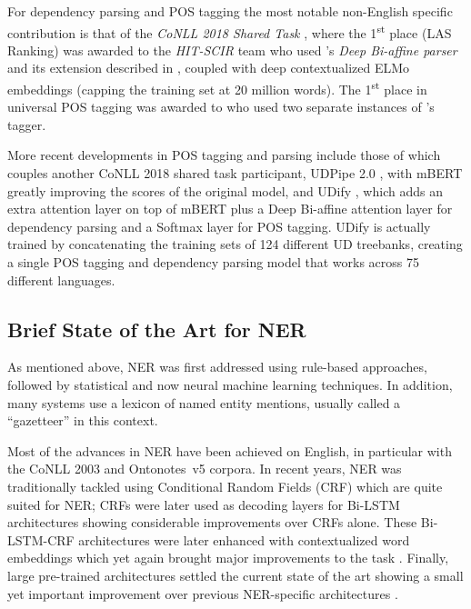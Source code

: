 For dependency parsing and POS tagging the most notable non-English specific contribution is that of the \emph{CoNLL 2018 Shared Task} \citep{zeman-etal-2018-conll}, where the 1\textsuperscript{st} place (LAS Ranking) was awarded to the \emph{HIT-SCIR} team \citep{che-etal-2018-towards} who used \citet{dozat-manning-2017-deep}'s \emph{Deep Bi-affine parser} and its extension described in \citep{dozat-etal-2017-stanfords}, coupled with deep contextualized ELMo embeddings \citep{peters-etal-2018-deep} (capping the training set at 20 million words). The 1\textsuperscript{st} place in universal POS tagging was awarded to \citet{smith-etal-2018-82} who used two separate instances of \citet{bohnet-etal-2018-morphosyntactic}'s tagger.

More recent developments in POS tagging and parsing include those of \citet{straka-strakova-2019-evaluating} which couples another CoNLL 2018 shared task participant, UDPipe 2.0 \citep{straka-2018-udpipe}, with mBERT greatly improving the scores of the original model, and UDify \citep{kondratyuk-straka-2019-75}, which adds an extra attention layer on top of mBERT plus a Deep Bi-affine attention layer for dependency parsing and a Softmax layer for POS tagging. UDify is actually trained by concatenating the training sets of 124 different UD treebanks, creating a single POS tagging and dependency parsing model that works across 75 different languages.

\subsection{Brief State of the Art for NER}
\label{subsec:sota}

As mentioned above, NER was first addressed using rule-based approaches, followed by statistical and now neural machine learning techniques. In addition, many systems use a lexicon of named entity mentions, usually called a ``gazetteer'' in this context.

Most of the advances in NER  have been achieved on English, in particular with the CoNLL 2003 \citep{tjong-kim-sang-de-meulder-2003-introduction} and  Ontonotes~v5 \citep{pradhan-etal-2012-conll,pradhan-etal-2013-towards} corpora. In recent years, NER was traditionally tackled using Conditional Random Fields (CRF) \citep{lafferty-etal-2001-conditional} which are quite suited for NER; CRFs were later used as decoding layers for Bi-LSTM architectures \citep{huang-etal-2015-bidirectional,lample-etal-2016-neural} showing considerable improvements over CRFs alone. These Bi-LSTM-CRF architectures were later enhanced with contextualized word embeddings which yet again brought major improvements to the task \citep{peters-etal-2018-deep,akbik-etal-2018-contextual}. Finally, large pre-trained architectures settled the current state of the art showing a small yet important improvement over previous NER-specific architectures \citep{devlin-etal-2019-bert,baevski-etal-2019-cloze}.

